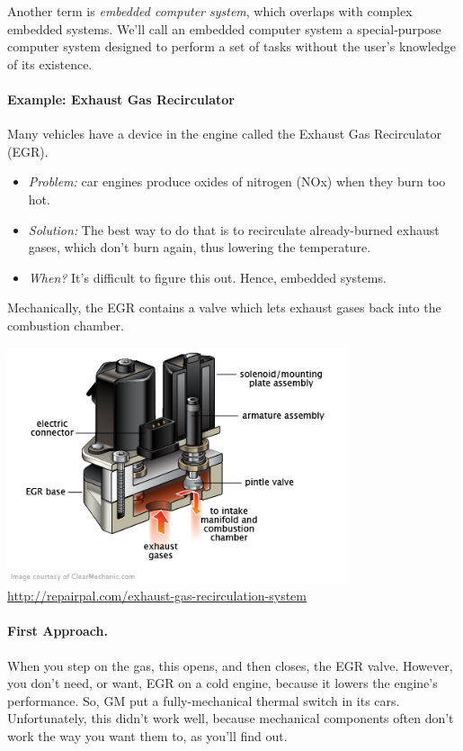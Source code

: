 Another term is \textit{embedded computer system}, which overlaps with
complex embedded systems. We'll call an embedded computer system a special-purpose computer system designed to perform a set of tasks without the user's knowledge of its existence.


\paragraph{Example: Exhaust Gas Recirculator}
Many vehicles have a device in the engine called the Exhaust Gas Recirculator (EGR).
\begin{itemize}
	\item \emph{Problem:} car engines produce oxides of nitrogen (NOx) when they burn too hot. 
	\item \emph{Solution:} The best way to do that is to recirculate
already-burned exhaust gases, which don't burn again, thus lowering the
temperature.
	\item \emph{When?} It's difficult to figure this out. Hence, embedded
systems.
\end{itemize}

Mechanically, the EGR contains a valve which lets exhaust gases back
into the combustion chamber.

\begin{center}
\includegraphics[width=0.75\textwidth]{images/egrvalve.png}
\hfill \url{http://repairpal.com/exhaust-gas-recirculation-system}
\end{center}

\paragraph{First Approach.} When you step on the gas, this opens, and
then closes, the EGR valve. However, you don't need, or want, EGR on a
cold engine, because it lowers the engine's performance. So, GM put a
fully-mechanical thermal switch in its cars. Unfortunately, this
didn't work well, because mechanical components often don't work the
way you want them to, as you'll find out.

